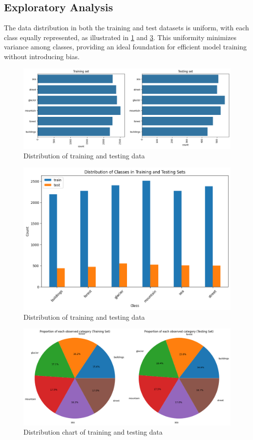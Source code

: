 \subsection{Exploratory Analysis}
The data distribution in both the training and test datasets is uniform, with each class equally represented, as illustrated in  \ref{fig:hist} and \ref{fig:pie}. This uniformity minimizes variance among classes, providing an ideal foundation for efficient model training without introducing bias.

\begin{figure}[h!]
    \centering
    \includegraphics[width=1\linewidth]{images/hist_test_x_train.png}
    \caption{Distribution of training and testing data}
    \label{fig:hist}
\end{figure}
\begin{figure}[h!]
    \centering
    \includegraphics[width=0.75\linewidth]{images/train_vs_test.png}
    \caption{Distribution of training and testing data}
    \label{fig:enter-label}
\end{figure}
\begin{figure}[h!]
    \centering
    \includegraphics[width=1\linewidth]{images/pie_test_x_train.png}
    \caption{Distribution chart of training and testing data}
    \label{fig:pie}
\end{figure}


